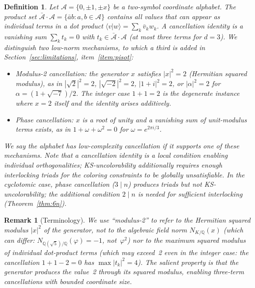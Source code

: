 \documentclass[12pt,a4paper]{article}
\newtheorem{definition}[theorem]{Definition}
\newtheorem{remark}[theorem]{Remark}
\newcommand{\Q}{\mathbb{Q}}
\begin{document}
\begin{definition}\label{def:cancellation}
Let $\mathcal{A} = \{0, \pm 1, \pm x\}$ be a two-symbol coordinate alphabet.  The \emph{product set} $\bar{\mathcal{A}} \cdot \mathcal{A} = \{\bar{a}b : a, b \in \mathcal{A}\}$ contains all values that can appear as individual terms in a dot product $\langle v | w \rangle = \sum_k \bar{v}_k w_k$.  A \emph{cancellation identity} is a vanishing sum $\sum_{k} t_k = 0$ with $t_k \in \bar{\mathcal{A}} \cdot \mathcal{A}$ (at most three terms for $d = 3$).  We distinguish two low-norm mechanisms, to which a third is added in Section~\ref{sec:limitations}, item~\ref{item:pisot}:
\begin{itemize}
\item \emph{Modulus-2 cancellation}: the generator $x$ satisfies $|x|^2 = 2$ (Hermitian squared modulus), as in $|\sqrt{2}|^2 = 2$, $|\sqrt{-2}|^2 = 2$, $|1+i|^2 = 2$, or $|\alpha|^2 = 2$ for $\alpha = (1+\sqrt{-7})/2$.  The integer case $1+1=2$ is the degenerate instance where $x = 2$ itself and the identity arises additively.
\item \emph{Phase cancellation}: $x$ is a root of unity and a vanishing sum of unit-modulus terms exists, as in $1 + \omega + \omega^2 = 0$ for $\omega = e^{2\pi i/3}$.
\end{itemize}
We say the alphabet has \emph{low-complexity cancellation} if it supports one of these mechanisms.  Note that a cancellation identity is a \emph{local} condition enabling individual orthogonalities; KS-uncolorability additionally requires enough interlocking triads for the coloring constraints to be globally unsatisfiable.  In the cyclotomic case, phase cancellation ($3 \mid n$) produces triads but not KS-uncolorability; the additional condition $2 \mid n$ is needed for sufficient interlocking (Theorem~\ref{thm:6n}).
\end{definition}

\begin{remark}[Terminology]\label{rem:norm-clarification}
We use ``modulus-2'' to refer to the Hermitian squared modulus $|x|^2$ of the generator, \emph{not} to the algebraic field norm $N_{K/\Q}(x)$ (which can differ: $N_{\Q(\sqrt{5})/\Q}(\varphi) = -1$, not~$\varphi^2$) nor to the maximum squared modulus of individual dot-product terms (which may exceed~2 even in the integer case: the cancellation $1 + 1 - 2 = 0$ has $\max|t_k|^2 = 4$).  The salient property is that the generator produces the value~2 through its squared modulus, enabling three-term cancellations with bounded coordinate size.
\end{remark}
\end{document}
